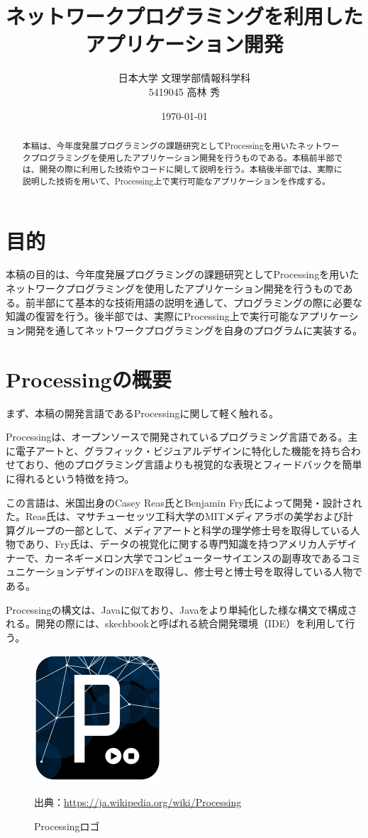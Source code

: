 \documentclass[dvipdfmx]{jsarticle}
\title{ネットワークプログラミングを利用したアプリケーション開発}
\date{\today}
\author{日本大学 文理学部情報科学科\\5419045 高林 秀}
\begin{document}
\maketitle

\begin{abstract}
本稿は、今年度発展プログラミングの課題研究としてProcessingを用いたネットワークプログラミングを使用したアプリケーション開発を行うものである。本稿前半部では、開発の際に利用した技術やコードに関して説明を行う。本稿後半部では、実際に説明した技術を用いて、Processing上で実行可能なアプリケーションを作成する。
\end{abstract}

\tableofcontents

\section{目的}
本稿の目的は、今年度発展プログラミングの課題研究としてProcessingを用いたネットワークプログラミングを使用したアプリケーション開発を行うものである。前半部にて基本的な技術用語の説明を通して、プログラミングの際に必要な知識の復習を行う。後半部では、実際にProcessing上で実行可能なアプリケーション開発を通してネットワークプログラミングを自身のプログラムに実装する。
\section{Processingの概要}
まず、本稿の開発言語であるProcessingに関して軽く触れる。\par
Processingは、オープンソースで開発されているプログラミング言語である。主に電子アートと、グラフィック・ビジュアルデザインに特化した機能を持ち合わせており、他のプログラミング言語よりも視覚的な表現とフィードバックを簡単に得れるという特徴を持つ。\par
この言語は、米国出身のCasey Reas氏とBenjamin Fry氏によって開発・設計された。Reas氏は、マサチューセッツ工科大学のMITメディアラボの美学および計算グループの一部として、メディアアートと科学の理学修士号を取得している人物であり、Fry氏は、データの視覚化に関する専門知識を持つアメリカ人デザイナーで、カーネギーメロン大学でコンピューターサイエンスの副専攻であるコミュニケーションデザインのBFAを取得し、修士号と博士号を取得している人物である。\par
Processingの構文は、Javaに似ており、Javaをより単純化した様な構文で構成される。開発の際には、skechbookと呼ばれる統合開発環境（IDE）を利用して行う。\par
\begin{figure}[H]
  \centering
  \includegraphics[scale=0.4]{images/180px-Processing_Logo_Clipped.svg.png}
  \caption{Processingロゴ}
  出典：\url{https://ja.wikipedia.org/wiki/Processing}
\end{figure}
\end{document}
